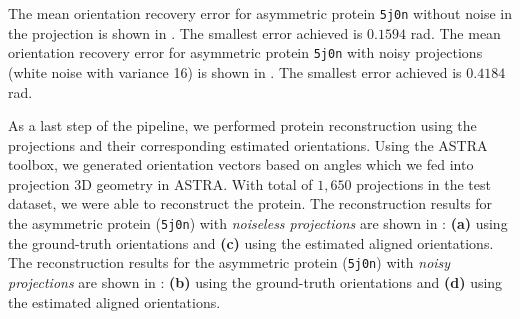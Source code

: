The mean orientation recovery error for asymmetric protein \texttt{5j0n} without noise in the projection is shown in .
The smallest error achieved is $0.1594$ rad.
The mean orientation recovery error for asymmetric protein \texttt{5j0n} with noisy projections (white noise with variance 16) is shown in .
The smallest error achieved is $0.4184$ rad.

As a last step of the pipeline, we performed protein reconstruction using the projections and their corresponding estimated orientations.
Using the ASTRA toolbox, we generated orientation vectors based on angles which we fed into projection 3D geometry in ASTRA.
With total of $1,650$ projections in the test dataset, we were able to reconstruct the protein. 
The reconstruction results for the asymmetric protein (\texttt{5j0n}) with \textit{noiseless projections} are shown in : \textbf{(a)} using the ground-truth orientations and \textbf{(c)} using the estimated aligned orientations. 
The reconstruction results for the asymmetric protein (\texttt{5j0n}) with \textit{noisy projections} are shown in : \textbf{(b)} using the ground-truth orientations and \textbf{(d)} using the estimated aligned orientations.

